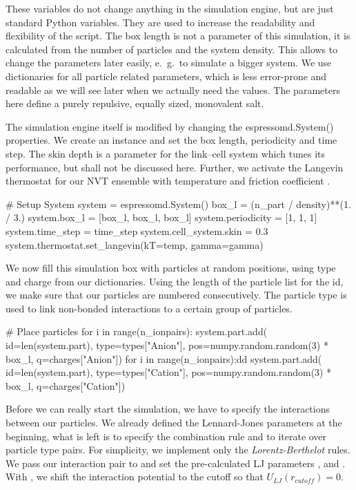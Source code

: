 \documentclass[
a4paper,                        %
11pt,                           %
twoside,                        %
footsepline,                    %
headsepline,                    %
headexclude,                    %
footexclude,                    %
pagesize,                       %
]{scrartcl}
\begin{document}
These variables do not change anything in the simulation engine, but
are just standard Python variables. They are used to increase the
readability and flexibility of the script. The box length is not a
parameter of this simulation, it is calculated from the number of
particles and the system density. This allows to change the parameters
later easily, e.~g.\ to simulate a bigger system.
We use dictionaries for all particle related parameters, which is less error-prone and
readable as we will see later when we actually need the values. The parameters here define a purely repulsive, 
equally sized, monovalent salt.

The simulation engine itself is modified by changing the
espressomd.System() properties. We create an instance  and
set the box length, periodicity and time step. The skin depth  
is a parameter for the link--cell system which tunes its
performance, but shall not be discussed here. Further, we activate the Langevin thermostat
for our NVT ensemble with temperature  and friction coefficient . 


\begin{pypresso}
# Setup System
system = espressomd.System()
box_l = (n_part / density)**(1. / 3.)
system.box_l = [box_l, box_l, box_l]
system.periodicity = [1, 1, 1]
system.time_step = time_step
system.cell_system.skin = 0.3
system.thermostat.set_langevin(kT=temp, gamma=gamma)
\end{pypresso}

We now fill this simulation box with particles at random positions, using type and charge from our dictionaries.
Using the length of the particle list  for the id, we make sure that our particles are numbered consecutively.
The particle type is used to link non-bonded interactions to a certain group of particles.

\begin{pypresso}
# Place particles
for i in range(n_ionpairs):
    system.part.add(
            id=len(system.part), 
            type=types["Anion"],  
            pos=numpy.random.random(3) * box_l, 
            q=charges["Anion"])
for i in range(n_ionpairs):dd
    system.part.add(
            id=len(system.part), 
            type=types["Cation"], 
            pos=numpy.random.random(3) * box_l, 
            q=charges["Cation"])
\end{pypresso}

Before we can really start the simulation, we have to specify the
interactions between our particles. We already defined the Lennard-Jones parameters at the beginning,
what is left is to specify the combination rule and to iterate over particle type pairs. For simplicity, 
we implement only the \emph{Lorentz-Berthelot} rules. 
We pass our interaction pair to  and set the 
pre-calculated LJ parameters ,  and . With ,
we shift the interaction potential to the cutoff so that $U_{LJ}(r_{cutoff})=0$.
\end{document}
